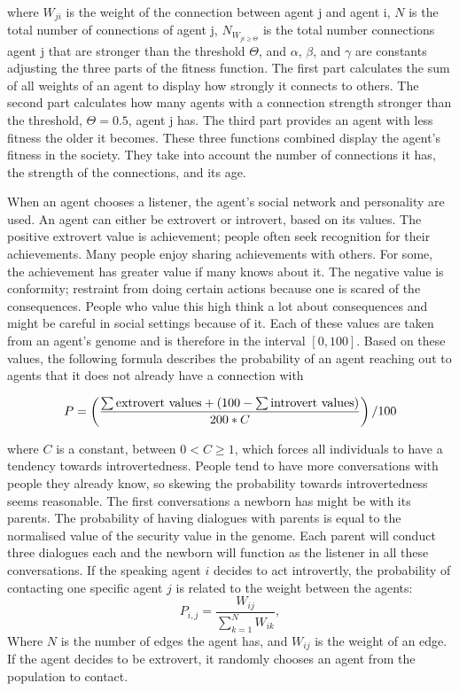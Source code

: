 where $W_{ji}$ is the weight of the connection between agent j and agent i, $N$ is the total number of connections of agent j, $ N_{W_{ji \geq \Theta}}$ is the total number connections agent j that are stronger than the threshold $\Theta$, and $\alpha$, $\beta$, and $\gamma$ are constants adjusting the three parts of the fitness function. The first part calculates the sum of all weights of an agent to display how strongly it connects to others. The second part calculates how many agents with a connection strength stronger than the threshold, $\Theta = 0.5$, agent j has. The third part provides an agent with less fitness the older it becomes. These three functions combined display the agent’s fitness in the society. They take into account the number of connections it has, the strength of the connections, and its age.

When an agent chooses a listener, the agent's social network and personality are used. An agent can either be extrovert or introvert, based on its values. The positive extrovert value is achievement; people often seek recognition for their achievements. Many people enjoy sharing achievements with others. For some, the achievement has greater value if many knows about it. The negative value is conformity; restraint from doing certain actions because one is scared of the consequences. People who value this high think a lot about consequences and might be careful in social settings because of it. Each of these values are taken from an agent’s genome and is therefore in the interval $[0, 100]$. Based on these values, the following formula describes the probability of an agent reaching out to agents that it does not already have a connection with

\begin{equation}\label{eq:chooseListener}
P = \left( \frac{\sum \text{extrovert values} + (100 - \sum \text{introvert values})}{200\ast C} \right)/100
\end{equation}

where $C$ is a constant, between $0 < C \geq 1$, which forces all individuals to have a tendency towards introvertedness. People tend to have more conversations with people they already know, so skewing the probability towards introvertedness seems reasonable. The first conversations a newborn has might be with its parents. The probability of having dialogues with parents is equal to the normalised value of the security value in the genome. Each parent will conduct three dialogues each and the newborn will function as the listener in all these conversations. If the speaking agent $i$ decides to act introvertly, the probability of contacting one specific agent $j$ is related to the weight between the agents:
\begin{equation}\label{eq:intrvertListener}
P_{i,j} = \frac{W_{ij}}{\sum_{k=1}^{N}{W_{ik}}},
\end{equation}
Where $N$ is the number of edges the agent has, and $W_{ij}$ is the weight of an edge. If the agent decides to be extrovert, it randomly chooses an agent from the population to contact.

